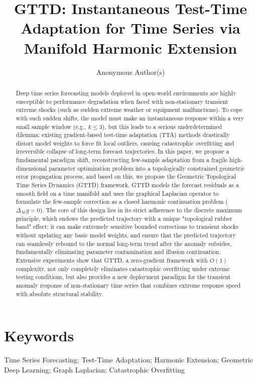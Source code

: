 \documentclass{article}
\title{GTTD: Instantaneous Test-Time Adaptation for Time Series via Manifold Harmonic Extension}
\author{Anonymous Author(s)}
\begin{document}
\maketitle

\begin{abstract}
            Deep time series forecasting models deployed in open-world environments are highly susceptible to performance degradation when faced with non-stationary transient extreme shocks (such as sudden extreme weather or equipment malfunctions). To cope with such sudden shifts, the model must make an instantaneous response within a very small sample window (e.g., $k \le 3$), but this leads to a serious underdetermined dilemma: existing gradient-based test-time adaptation (TTA) methods drastically distort model weights to force fit local outliers, causing catastrophic overfitting and irreversible collapse of long-term forecast trajectories. In this paper, we propose a fundamental paradigm shift, reconstructing few-sample adaptation from a fragile high-dimensional parameter optimization problem into a topologically constrained geometric error propagation process, and based on this, we propose the Geometric Topological Time Series Dynamics (GTTD) framework. GTTD models the forecast residuals as a smooth field on a time manifold and uses the graphical Laplacian operator to formulate the few-sample correction as a closed harmonic continuation problem ($\Delta_{\mathcal{M}}g=0$). The core of this design lies in its strict adherence to the discrete maximum principle, which endows the predicted trajectory with a unique "topological rubber band" effect: it can make extremely sensitive bounded corrections to transient shocks without updating any basic model weights, and ensure that the predicted trajectory can seamlessly rebound to the normal long-term trend after the anomaly subsides, fundamentally eliminating parameter contamination and illusion continuation. Extensive experiments show that GTTD, a zero-gradient framework with $O(1)$ complexity, not only completely eliminates catastrophic overfitting under extreme testing conditions, but also provides a new deployment paradigm for the transient anomaly response of non-stationary time series that combines extreme response speed with absolute structural stability.
		
		\end{abstract}
	

\section*{Keywords}
Time Series Forecasting; Test-Time Adaptation; Harmonic Extension; Geometric Deep Learning; Graph Laplacian; Catastrophic Overfitting
\end{document}
